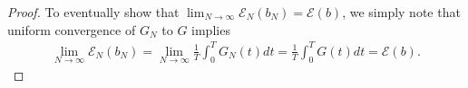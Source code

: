 \begin{proof}
	To eventually show that $\lim_{N \rightarrow \infty} \mathcal E_N( b_N) = \mathcal E( b)$, we simply note that uniform convergence of $G_N$ to $G$ implies 
	\begin{align*}
		\lim_{N \rightarrow \infty} \mathcal E_N( b_N) =  \lim_{N\rightarrow\infty} \frac{1}{T} \int^T_0 G_N(t) dt = \frac{1}{T} \int^T_0 G(t) dt = \mathcal E( b).
	\end{align*}
\end{proof}

